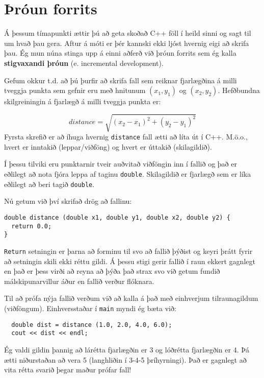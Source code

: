 \section{Þróun forrits}
\label{distance}

Á þessum tímapunkti ættir þú að geta skoðað C++ föll í heild sinni og sagt til um hvað þau gera.
Aftur á móti er þér kannski ekki ljóst hvernig eigi að skrifa þau.
Ég mun núna stinga upp á einni aðferð við þróun forrits sem ég kalla {\bf stigvaxandi þróun} (e. incremental development).


Gefum okkur t.d. að þú þurfir að skrifa fall sem reiknar fjarlægðina á milli tveggja punkta sem gefnir eru með hnitunum $(x_1, y_1)$ og $(x_2, y_2)$.
Hefðbundna skilgreiningin á fjarlægð á milli tveggja punkta er:

\begin{equation}
distance = \sqrt{(x_2 - x_1)^2 + (y_2 - y_1)^2}
\end{equation}
%
Fyrsta skrefið er að íhuga hvernig {\tt distance} fall ætti að líta út í C++.
M.ö.o., hvert er inntakið (leppar/viðföng) og hvert er úttakið (skilagildið).

Í þessu tilviki eru punktarnir tveir auðvitað viðföngin inn í fallið og það er eðlilegt að nota fjóra leppa af taginu {\tt double}.
Skilagildið er fjarlægð sem er líka eðlilegt að beri tagið {\tt double}.

Nú getum við því skrifað drög að fallinu:

\begin{verbatim}
double distance (double x1, double y1, double x2, double y2) {
  return 0.0;
}
\end{verbatim}
%
{\tt Return} setningin er þarna að forminu til svo að fallið þýðist og keyri þrátt fyrir að setningin skili ekki réttu gildi.
Á þessu stigi gerir fallið í raun ekkert gagnlegt en það er þess virði að reyna að þýða það strax svo við getum fundið málskipunarvillur áður en fallið verður flóknara.

Til að prófa nýja fallið verðum við að kalla á það með einhverjum tilraunagildum (viðföngum).
Einhversstaðar í {\tt main} myndi ég bæta við:

\begin{verbatim}
  double dist = distance (1.0, 2.0, 4.0, 6.0);
  cout << dist << endl;
\end{verbatim}
%
Ég valdi gildin þannig að lárétta fjarlægðin er 3 og lóðrétta fjarlægðin er 4.
Þá ætti niðurstaðan að vera 5 (langhliðin í 3-4-5 þríhyrningi).
Það er gagnlegt að vita rétta svarið þegar maður prófar fall!


